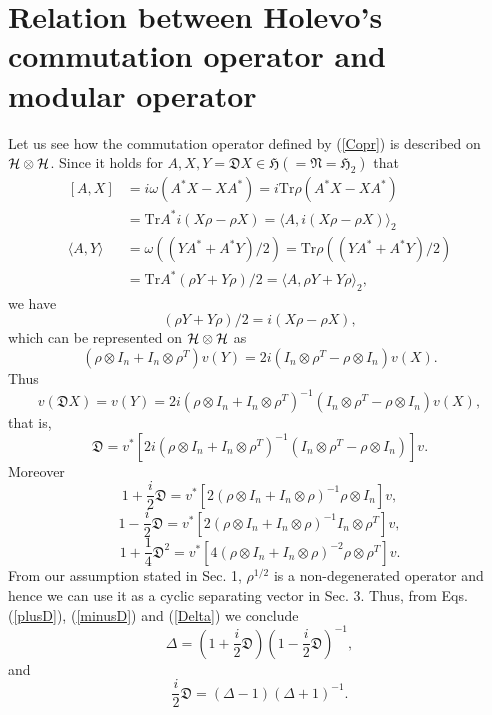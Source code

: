 \section{Relation between Holevo's commutation operator and modular operator}

Let us see how the commutation operator defined by  (\ref{Copr}) is described on $\cal{H}\otimes \cal{H}$.
Since it holds for $A,X,Y=\mathfrak{D}X\in \mathfrak{H}(=\mathfrak{N}=\mathfrak{H}_2)$
that 
 \begin{equation}
 \begin{split}
 [A,X]&=i\omega(A^\ast X-XA^\ast)=i\mbox{Tr}\rho(A^\ast X-XA^\ast)\\
      &=\mbox{Tr}A^\ast i(X\rho-\rho X)=\langle A, i(X\rho-\rho X)\rangle_2\\
 \langle A,Y\rangle&=\omega((YA^\ast+A^\ast Y)/2)=\mbox{Tr}\rho((YA^\ast+A^\ast Y)/2)\\
 &=\mbox{Tr}A^\ast(\rho Y+Y\rho)/2=\langle A, \rho Y+Y\rho \rangle_2,
 \end{split}
 \end{equation}
  we have
 $$
 (\rho Y+Y\rho)/2=i(X\rho-\rho X),
 $$
 which can be represented on $\cal{H}\otimes \cal{H}$ as
	$$
	(\rho\otimes I_n+I_n\otimes \rho^T )v(Y)=2i(I_n\otimes \rho^T-\rho\otimes I_n)v(X).
	$$
	Thus 
	$$
	v(\mathfrak{D}X)=v(Y)=2i(\rho\otimes I_n+I_n\otimes \rho^T )^{-1}(I_n\otimes \rho^T -\rho\otimes I_n )v(X),
	$$
	that is,
	$$
	\mathfrak{D}=v^\ast[ 2i( \rho\otimes I_n+I_n\otimes \rho^T )^{-1}(I_n\otimes \rho^T -\rho\otimes I_n )]v.
	$$
	 Moreover
	\begin{equation} \label{plusD} 
    1+\frac{i}{2}\mathfrak{D}=v^\ast [ 2(\rho\otimes I_n+I_n\otimes \rho)^{-1}  \rho \otimes I_n]v,
    \end{equation}
    \begin{equation}\label{minusD}
    1-\frac{i}{2}\mathfrak{D}=v^\ast [ 2(\rho\otimes I_n+I_n\otimes \rho)^{-1}I_n \otimes \rho^T]v,
    \end{equation}
    \begin{equation}
    1+\frac{1}{4}\mathfrak{D}^2=v^\ast[ 4(\rho\otimes I_n+I_n\otimes \rho)^{-2}\rho \otimes \rho^T]v.
	\end{equation}
From our assumption stated in Sec. 1,
$\rho^{1/2}$ is a non-degenerated operator and hence we can use it as a 
cyclic separating vector in Sec. 3.
Thus, from Eqs. (\ref{plusD}), (\ref{minusD}) and (\ref{Delta})  we conclude
		$$
    \Delta=\left(1+\frac{i}{2}\mathfrak{D}\right)\left(1-\frac{i}{2}\mathfrak{D}\right)^{-1},
		$$
		and
		$$
     \frac{i}{2}\mathfrak{D}=(\Delta-1)(\Delta+1)^{-1}.
		$$